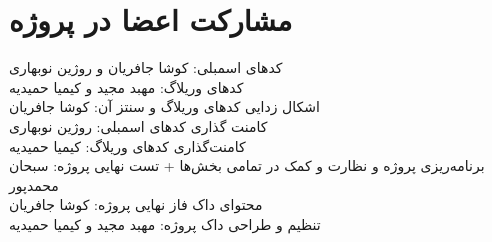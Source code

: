 \section*{مشارکت اعضا در پروژه}
کدهای اسمبلی: کوشا جافریان و روژین نوبهاری
\\
کدهای وریلاگ: مهبد مجید و کیمیا حمیدیه
\\
اشکال زدایی کدهای وریلاگ و سنتز آن: کوشا جافریان
\\
کامنت گذاری کدهای اسمبلی: روژین نوبهاری
\\
کامنت‌گذاری کدهای وریلاگ: کیمیا حمیدیه
\\
برنامه‌ریزی پروژه و نظارت و کمک در تمامی بخش‌ها + تست نهایی پروژه: سبحان محمدپور
\\
محتوای داک فاز نهایی پروژه: کوشا جافریان
\\
تنظیم و طراحی داک پروژه: مهبد مجید و کیمیا حمیدیه